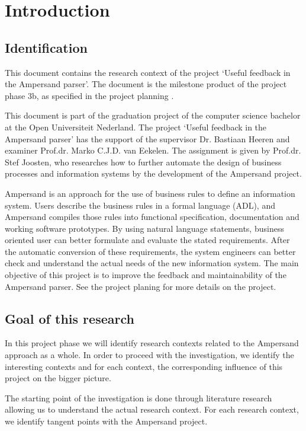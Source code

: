 
\section{Introduction}
\subsection{Identification}
This document contains the research context of the project `Useful feedback in the Ampersand parser'.
The document is the milestone product of the project phase 3b, as specified in the project planning .

This document is part of the graduation project of the computer science bachelor at the Open Universiteit Nederland.
The project `Useful feedback in the Ampersand parser' has the support of the supervisor Dr. Bastiaan Heeren and examiner Prof.dr. Marko C.J.D. van Eekelen.
The assignment is given by Prof.dr. Stef Joosten, who researches how to further automate the design of business processes and information systems by the development of the Ampersand project.

Ampersand is an approach for the use of business rules to define an information system.
Users describe the business rules in a formal language (ADL), and Ampersand compiles those rules into functional specification, documentation and working software prototypes. 
By using natural language statements, business oriented user can better formulate and evaluate the stated requirements.
After the automatic conversion of these requirements, the system engineers can better check and understand the actual needs of the new information system.
The main objective of this project is to improve the feedback and maintainability of the Ampersand parser.
See the project planing  for more details on the project.

\subsection{Goal of this research}
In this project phase we will identify research contexts related to the Ampersand approach as a whole.
In order to proceed with the investigation, we identify the interesting contexts and for each context, the corresponding influence of this project on the bigger picture.

The starting point of the investigation is done through literature research allowing us to understand the actual research context.
For each research context, we identify tangent points with the Ampersand project.

